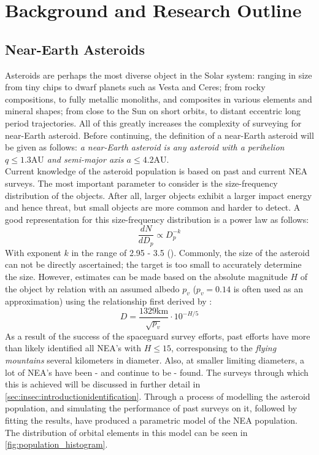 \chapter{Background and Research Outline}

\section{Near-Earth Asteroids}
\label{sec:introduction_NEA}
Asteroids are perhaps the most diverse object in the Solar system: ranging in size from tiny chips to dwarf planets such as Vesta and Ceres; from rocky compositions, to fully metallic monoliths, and composites in various elements and mineral shapes; from close to the Sun on short orbits, to distant eccentric long period trajectories. All of this greatly increases the complexity of surveying for near-Earth asteroid. Before continuing, the definition of a near-Earth asteroid will be given as follows: \textit{a near-Earth asteroid is any asteroid with a perihelion $q \leq 1.3 \mathrm{AU}$ and semi-major axis $a \leq 4.2 \mathrm{AU}$}. \\

Current knowledge of the asteroid population is based on past and current NEA surveys. The most important parameter to consider is the size-frequency distribution of the objects. After all, larger objects exhibit a larger impact energy and hence threat, but small objects are more common and harder to detect. A good representation for this size-frequency distribution is a power law as follows:
\begin{equation}
 \frac{dN}{dD_p} \propto D_p^{-k}
 \label{eq:sizefreqlaw}
\end{equation}
With exponent $k$ in the range of 2.95 - 3.5 (\cite{AsteroidSizeFrequency}). Commonly, the size of the asteroid can not be directly ascertained; the target is too small to accurately determine the size. However, estimates can be made based on the absolute magnitude $H$ of the object by relation with an assumed albedo $p_v$ ($p_v = 0.14$ is often used as an approximation) using the relationship first derived by \cite{AsteroidSizeAlbedo}:
\begin{equation}
 D = \frac{1329 \mathrm{km}}{\sqrt{p_v}}\cdot 10^{-H/5}
 \label{eq:asteroidsize}
\end{equation}
As a result of the success of the spaceguard survey efforts, past efforts have more than likely identified all NEA's with $H \leq 15$, corresponsing to the \textit{flying mountains} several kilometers in diameter. Also, at smaller limiting diameters, a lot of NEA's have been - and continue to be - found. The surveys through which this is achieved will be discussed in further detail in \autoref{sec:insec:introductionidentification}. Through a process of modelling the asteroid population, and simulating the performance of past surveys on it, followed by fitting the results, \cite{GranvikPopulation} have produced a parametric model of the NEA population. The distribution of orbital elements in this model can be seen in \autoref{fig:population_histogram}. \\

